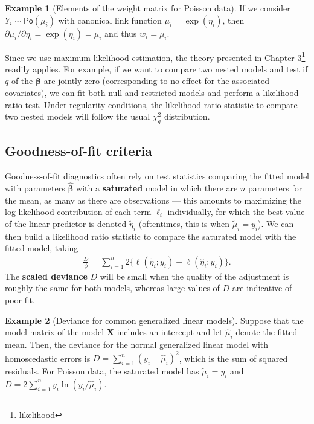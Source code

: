 \documentclass[
  11pt,
  letterpaper,
]{book}
\renewcommand{\href}[2]{#2\footnote{\url{#1}}}
\theoremstyle{definition}
\theoremstyle{definition}
\newtheorem{example}{Example}[chapter]
\theoremstyle{definition}
\theoremstyle{definition}
\theoremstyle{remark}
\begin{document}
\begin{example}[Elements of the weight matrix for Poisson data]
\protect\hypertarget{exm:weightpois}{}\label{exm:weightpois}If we consider \(Y_i \sim \mathsf{Po}(\mu_i)\) with canonical link function \(\mu_i = \exp(\eta_i)\), then \(\partial \mu_i/\partial \eta_i =\exp(\eta_i)= \mu_i\) and thus \(w_i=\mu_i\).
\end{example}

Since we use maximum likelihood estimation, the theory presented in
\href{likelihood}{Chapter 3} readily applies. For example, if we want to
compare two nested models and test if \(q\) of the \(\boldsymbol{\beta}\)
are jointly zero (corresponding to no effect for the associated
covariates), we can fit both null and restricted models and perform a
likelihood ratio test. Under regularity conditions, the likelihood ratio
statistic to compare two nested models will follow the usual \(\chi^2_q\)
distribution.

\hypertarget{goodness-of-fit-criteria}{%
\subsection{Goodness-of-fit criteria}\label{goodness-of-fit-criteria}}

Goodness-of-fit diagnostics often rely on test statistics comparing the
fitted model with parameters \(\widehat{\boldsymbol{\beta}}\) with a
\textbf{saturated} model in which there are \(n\) parameters for the mean, as
many as there are observations --- this amounts to maximizing the
log-likelihood contribution of each term \(\ell_i\) individually, for
which the best value of the linear predictor is denoted
\(\widetilde{\eta}_i\) (oftentimes, this is when \(\widetilde{\mu}_i=y_i\)).
We can then build a likelihood ratio statistic to compare the saturated
model with the fitted model, taking
\begin{align*}
\frac{D}{\phi}= \sum_{i=1}^n 2\{\ell(\widetilde{\eta}_i; y_i) - \ell(\widehat{\eta}_i; y_i)\}.
\end{align*}
The \textbf{scaled deviance} \(D\) will be small when the quality
of the adjustment is roughly the same for both models, whereas large
values of \(D\) are indicative of poor fit.

\begin{example}[Deviance for common generalized linear models]
\protect\hypertarget{exm:devglm}{}\label{exm:devglm}Suppose that the model matrix of the model \(\mathbf{X}\) includes an intercept and let \(\widehat{\mu}_i\) denote the fitted mean. Then, the deviance for the normal generalized linear model with homoscedastic errors is \(D = \sum_{i=1}^n (y_i - \widehat{\mu}_i)^2\), which is the sum of squared residuals. For Poisson data, the saturated model has \(\widetilde{\mu}_i=y_i\) and \(D= 2\sum_{i=1}^n y_i \ln(y_i/\widehat{\mu}_i)\).
\end{example}
\end{document}
